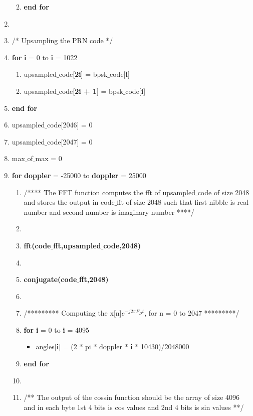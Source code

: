 \documentclass[journal,10pt,onecolumn]{article}
\begin{document}
\begin{enumerate}
\begin{enumerate}
\begin{enumerate}
        \end{enumerate}

        \item[] \textbf{end for}
    \end{enumerate}
    \item[]
    \item[] /* Upsampling the PRN code */
    \item[] \textbf{for} \textbf{i} = 0 to \textbf{i} = 1022
    \begin{enumerate}
        \item[] upsampled$\_$code[\textbf{2i}] =  bpsk$\_$code[\textbf{i}]
        \item[] upsampled$\_$code[\textbf{2i + 1}] =  bpsk$\_$code[\textbf{i}]
    \end{enumerate}
    \item[] \textbf{end for}
    \item[] upsampled$\_$code[2046] = 0
    \item[] upsampled$\_$code[2047] = 0
    \item[] max$\_$of$\_$max = 0
    \item[] \textbf{for} \textbf{doppler} = -25000 to \textbf{doppler} = 25000
    \begin{enumerate}
        \item[] /**** The FFT function computes the fft of upsampled$\_$code of size 2048 and stores the output in code$\_$fft of size 2048 such that first nibble is real number and second number is imaginary number ****/
        \item[] 
        \item[] \textbf{fft(code$\_$fft,upsampled$\_$code,2048)}
        \item[] 
        \item[] \textbf{conjugate(code$\_$fft,2048)}
        \item[] 
        \item[]  /********* Computing the x[n]$e^{-j2 \pi F_Dt}$, for n = 0 to 2047 *********/
        \item[] \textbf{for} \textbf{i} = 0 to \textbf{i} = 4095
        \begin{itemize}
            \item[] angles[\textbf{i}] = (2 * pi * doppler * \textbf{i} * 10430)/2048000
        \end{itemize}
        \item[] \textbf{end for}
        \item[] 
        \item[] /** The output of the cossin function should be the array of size 4096 and in each byte 1st 4 bits is cos values and 2nd 4 bits is sin values **/

\end{enumerate}
\end{enumerate}
\end{document}

